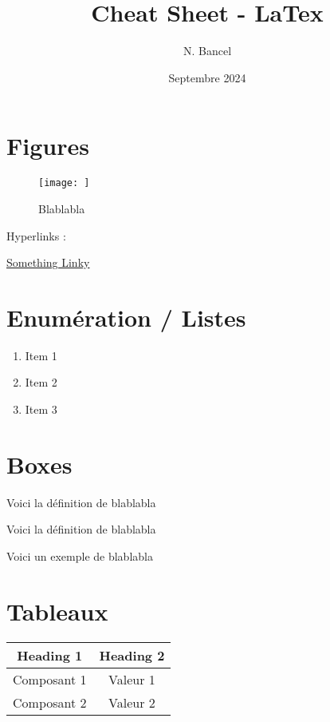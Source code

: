 \documentclass[a4paper,12pt]{article}
\begin{document}
\title{Cheat Sheet - LaTex}
\author{N. Bancel}
\date{Septembre 2024}
\maketitle

\section{Figures}

\begin{figure}[H]
  \centering
  \texttt{[image: ]}
  \caption{\label{} Blablabla}
\end{figure}

Hyperlinks : 

\href{http://www.overleaf.com}{Something Linky} 

\section{Enumération / Listes}

\begin{enumerate}[noitemsep]
  \item Item 1
  \item Item 2
  \item Item 3
\end{enumerate}

\section{Boxes}

\begin{tcolorbox}[colback=red!10!white, colframe=red!75!black, title=PAR COEUR]
  Voici la définition de blablabla
\end{tcolorbox}


\begin{tcolorbox}[colback=green!10!white, colframe=green!75!black, title=Définition : xxx]
  Voici la définition de blablabla
\end{tcolorbox}

\begin{tcolorbox}[colback=blue!10!white, colframe=blue!75!black, title=Exemples - Application]
  Voici un exemple de blablabla
\end{tcolorbox}

\section{Tableaux}

\begin{tabular}{SS}
  \toprule
  {Heading 1} & {Heading 2} \\
  \midrule
  {Composant 1} & {Valeur 1} \\
  {Composant 2} & {Valeur 2} \\
  \bottomrule
\end{tabular}
\end{document}
